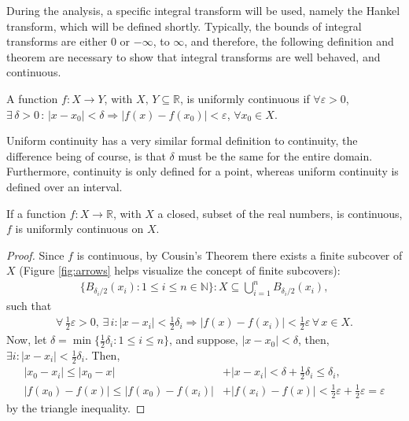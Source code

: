 During the analysis, a specific integral transform will be used, namely the Hankel transform, which will be defined shortly. Typically, the bounds of integral transforms are either $0$ or $-\infty$, to $\infty$, and therefore, the following definition and theorem are necessary to show that integral transforms are well behaved, and continuous.

\begin{definition}
A function $f: X \rightarrow Y$, with $X, \, Y \subseteq \mathbb{R}$, is uniformly continuous if $\forall \varepsilon > 0$, $\exists \, \delta > 0 \, : \, |x-x_0| < \delta \Rightarrow |f(x) - f(x_0)| < \varepsilon$, $ \forall x_0 \in X$.
\end{definition}

Uniform continuity has a very similar formal definition to continuity, the difference being of course, is that  $\delta$ must be the same for the entire domain. Furthermore, continuity is only defined for a point, whereas uniform continuity is defined over an interval.

\begin{theorem}[Heine-Cantor Theorem]
If a function $f: X \rightarrow \mathbb{R}$, with $X$ a closed, subset of the real numbers, is continuous, $f$ is uniformly continuous on $X$.
\label{thm:uniform}
\end{theorem}
\begin{proof}
Since $f$ is continuous, by Cousin's Theorem \cite{cousin} there exists a finite subcover of $X$ (Figure \ref{fig:arrows} helps visualize the concept of finite subcovers):
\begin{align*}
\{ B_{\delta_i/2} (x_i) : 1 \leq i \leq n \in \mathbb{N} \} : X \subseteq \bigcup_{i=1}^n B_{\delta_i/2}(x_i),
\end{align*}
such that
\begin{align*}
\forall \, \frac{1}{2}\varepsilon > 0, \, \exists \, i : |x-x_i| < \frac{1}{2} \delta_i \Rightarrow |f(x)-f(x_i)| < \frac{1}{2}\varepsilon \, \forall \, x \in X.
\end{align*}
Now, let $\delta = \min \{ \frac{1}{2} \delta_i : 1 \leq i \leq n \}$, and suppose, $|x-x_0| < \delta$, then, $\exists i : |x-x_i| < \frac{1}{2}\delta_i$.  Then,
\begin{align*}
|x_0-x_i| \leq |x_0-x| &+ |x-x_i| < \delta + \frac{1}{2}\delta_i \leq \delta_i, \\
|f(x_0)-f(x)| \leq |f(x_0)-f(x_i)| &+ |f(x_i)-f(x)| < \frac{1}{2}\varepsilon + \frac{1}{2}\varepsilon = \varepsilon
\end{align*}
by the triangle inequality.
\end{proof}

